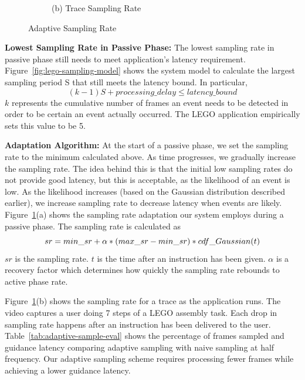 \begin{figure}
\begin{subfigure}{.45\linewidth}
   {(b) Trace Sampling Rate}
\end{subfigure}
\caption{Adaptive Sampling Rate}
\label{fig:adaptive-sampling-example}
\end{figure}

\textbf{Lowest Sampling Rate in Passive Phase: }
The lowest sampling rate in passive phase still needs to meet application's
latency requirement. Figure~\ref{fig:lego-sampling-model} shows the system model
to calculate the largest sampling period S that still meets the latency bound.
In particular,
$$(k-1)S + processing\_delay \leq latency\_bound $$ $k$ represents the
cumulative number of frames an event needs to be detected in order to be
certain an event actually occurred. The LEGO application empirically sets this
value to be 5. 

\textbf{Adaptation Algorithm: }
At the start of a passive phase, we set the sampling rate to the
minimum calculated above.  As time progresses, we gradually increase
the sampling rate.  The idea behind this is that the initial low
sampling rates do not provide good latency, but this is acceptable, as
the likelihood of an event is low.  As the likelihood increases (based
on the Gaussian distribution described earlier), we increase sampling
rate to decrease latency when events are likely.
Figure~\ref{fig:adaptive-sampling-example}(a) shows the sampling rate
adaptation our system employs during a passive phase.
The sampling rate is calculated as $$sr = \\
%
 min\_sr + \alpha * (max\_sr - min\_sr) * cdf\_Gaussian(t)$$ 
%
$sr$ is the sampling rate. $t$ is the time after an instruction has been given. $\alpha$ is
a recovery factor which determines how quickly the sampling rate
rebounds to active phase rate. 


Figure~\ref{fig:adaptive-sampling-example}(b) shows the sampling rate
for a trace as the application runs. The video captures a user doing 7
steps of a LEGO assembly task. Each drop in sampling rate happens
after an instruction has been delivered to the user.
Table~\ref{tab:adaptive-sample-eval} shows the percentage of frames
sampled and guidance latency comparing adaptive sampling with naive
sampling at half frequency. Our adaptive sampling scheme requires
processing fewer frames while achieving a lower guidance latency.

